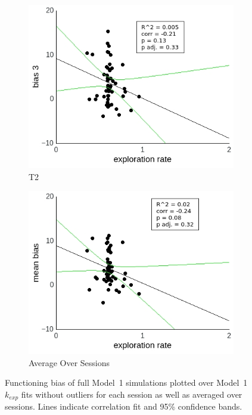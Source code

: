 \documentclass[a4paper]{scrreprt}
\begin{document}
\begin{figure}
\begin{subfigure}[b]{0.49\textwidth}
        \includegraphics[width=\textwidth]{figs/sec3/temp/tempno_diff_3_mod1mod1.jpeg}
        \caption{T2}
    \end{subfigure}
    \begin{subfigure}[b]{0.49\textwidth}
        \includegraphics[width=\textwidth]{figs/sec3/temp/tempno_diff_mean_mod1mod1.jpeg}
        \caption{Average Over Sessions}
    \end{subfigure}
\caption{Functioning bias of full Model~1 simulations plotted over Model~1 $k_{exp}$ fits without outliers for each session as well as averaged over sessions. Lines indicate correlation fit and 95\% confidence bands.}
\label{fig:tempno_diff_mod1mod1}
\end{figure}
\end{document}
